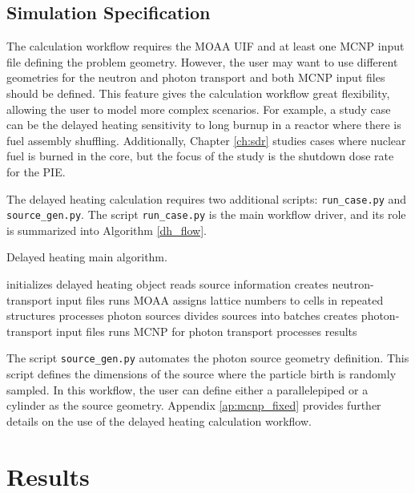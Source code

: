 \subsection{Simulation Specification}

The calculation workflow requires the MOAA UIF and at least one MCNP input file defining the problem geometry.
However, the user may want to use different geometries for the neutron and photon transport and both MCNP input files should be defined.
This feature gives the calculation workflow great flexibility, allowing the user to model more complex scenarios.
For example, a study case can be the delayed heating sensitivity to long burnup in a reactor where there is fuel assembly shuffling.
Additionally, Chapter \ref{ch:sdr} studies cases where nuclear fuel is burned in the core, but the focus of the study is the shutdown dose rate for the \gls*{PIE}.

The delayed heating calculation requires two additional scripts: \texttt{run\_case.py} and \texttt{source\_gen.py}.
The script \texttt{run\_case.py} is the main workflow driver, and its role is summarized into Algorithm \ref{dh_flow}.

\begin{algorithm}
  \caption{Delayed heating main algorithm.}
  \label{dh_flow}
  \begin{algorithmic}[1]
    \State initializes delayed heating object
    \State reads source information
    \State creates neutron-transport input files
    \State runs MOAA
    \State assigns lattice numbers to cells in repeated structures
    \State processes photon sources
    \State divides sources into batches
    \State creates photon-transport input files
    \State runs MCNP for photon transport
    \State processes results
  \end{algorithmic}
\end{algorithm}

The script \texttt{source\_gen.py} automates the photon source geometry definition.
This script defines the dimensions of the source where the particle birth is randomly sampled.
In this workflow, the user can define either a parallelepiped or a cylinder as the source geometry.
Appendix \ref{ap:mcnp_fixed} provides further details on the use of the delayed heating calculation workflow.


\section{Results}
\label{sec:results}


